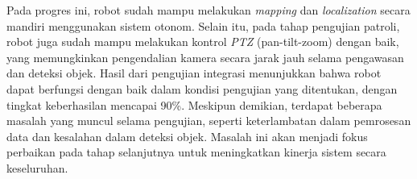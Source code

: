 Pada progres ini, robot sudah mampu melakukan \emph{mapping} dan \emph{localization} secara mandiri menggunakan sistem otonom. Selain itu, pada tahap pengujian patroli, robot juga sudah mampu melakukan kontrol \emph{PTZ} (pan-tilt-zoom) dengan baik, yang memungkinkan pengendalian kamera secara jarak jauh selama pengawasan dan deteksi objek.  Hasil dari pengujian integrasi menunjukkan bahwa robot dapat berfungsi dengan baik dalam kondisi pengujian yang ditentukan, dengan tingkat keberhasilan mencapai 90\%. Meskipun demikian, terdapat beberapa masalah yang muncul selama pengujian, seperti keterlambatan dalam pemrosesan data dan kesalahan dalam deteksi objek. Masalah ini akan menjadi fokus perbaikan pada tahap selanjutnya untuk meningkatkan kinerja sistem secara keseluruhan.
